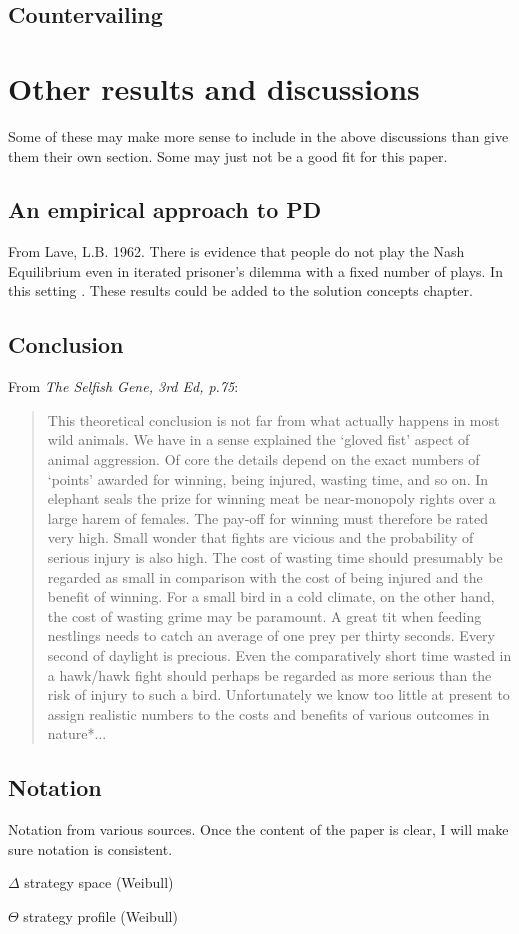 \section{Countervailing}

\chapter{Other results and discussions}
Some of these may make more sense to include in the above discussions than give them their own section. Some may just not be a good fit for this paper.
\section{An empirical approach to PD}
From Lave, L.B. 1962. There is evidence that people do not play the Nash Equilibrium even in iterated prisoner's dilemma with a fixed number of plays. In this setting . These results could be added to the solution concepts chapter.

\section{Conclusion}
From \emph{The Selfish Gene, 3rd Ed, p.75}:
\begin{quote}
This theoretical conclusion is not far from what actually happens in most wild animals. We have in a sense explained the `gloved fist' aspect of animal aggression. Of core the details depend on the exact numbers of `points' awarded for winning, being injured, wasting time, and so on. In elephant seals the prize for winning meat be near-monopoly rights over a large harem of females. The pay-off for winning must therefore be rated very high. Small wonder that fights are vicious and the probability of serious injury is also high. The cost of wasting time should presumably be regarded as small in comparison with the cost of being injured and the benefit of winning. For a small bird in a cold climate, on the other hand, the cost of wasting grime may be paramount. A great tit when feeding nestlings needs to catch an average of one prey per thirty seconds. Every second of daylight is precious. Even the comparatively short time wasted in a hawk/hawk fight should perhaps be regarded as more serious than the risk of injury to such a bird. Unfortunately we know too little at present to assign realistic numbers to the costs and benefits of various outcomes in nature*...
\end{quote}



\section{Notation}
Notation from various sources. Once the content of the paper is clear, I will make sure notation is consistent. 

$\Delta$ strategy space (Weibull)

$\Theta$ strategy profile (Weibull)









